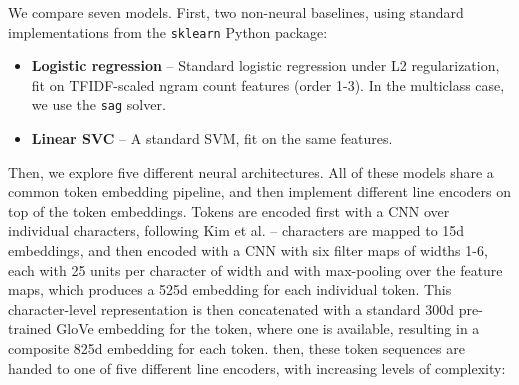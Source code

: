 \documentclass{scrartcl}
\begin{document}
We compare seven models. First, two non-neural baselines, using standard implementations from the \texttt{sklearn}\cite{scikit-learn} Python package:

\begin{itemize}
\item \textbf{Logistic regression} -- Standard logistic regression under L2 regularization, fit on TFIDF-scaled ngram count features (order 1-3). In the multiclass case, we use the \texttt{sag} solver.

\item \textbf{Linear SVC} -- A standard SVM, fit on the same features.
\end{itemize}

Then, we explore five different neural architectures. All of these models share a common token embedding pipeline, and then implement different line encoders on top of the token embeddings. Tokens are encoded first with a CNN over individual characters, following Kim et al.\cite{kim2016character} -- characters are mapped to 15d embeddings, and then encoded with a CNN with six filter maps of widths 1-6, each with 25 units per character of width and with max-pooling over the feature maps, which produces a 525d embedding for each individual token. This character-level representation is then concatenated with a standard 300d pre-trained GloVe embedding for the token, where one is available, resulting in a composite 825d embedding for each token. then, these token sequences are handed to one of five different line encoders, with increasing levels of complexity:
\end{document}
